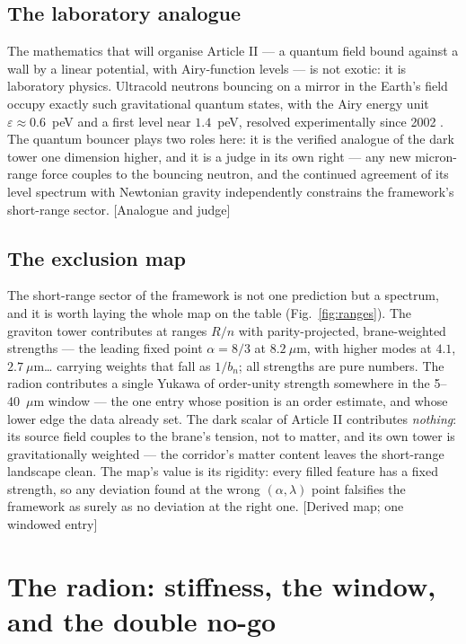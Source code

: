 \subsection{The laboratory analogue}
The mathematics that will organise Article II --- a quantum field bound against a wall by a linear potential, with Airy-function levels --- is not exotic: it is laboratory physics. Ultracold neutrons bouncing on a mirror in the Earth's field occupy exactly such gravitational quantum states, with the Airy energy unit $\varepsilon\approx0.6$~peV and a first level near $1.4$~peV, resolved experimentally since 2002 \cite{Nesv02}. The quantum bouncer plays two roles here: it is the verified analogue of the dark tower one dimension higher, and it is a judge in its own right --- any new micron-range force couples to the bouncing neutron, and the continued agreement of its level spectrum with Newtonian gravity independently constrains the framework's short-range sector. [Analogue and judge]

\subsection{The exclusion map}
The short-range sector of the framework is not one prediction but a spectrum, and it is worth laying the whole map on the table (Fig.~\ref{fig:ranges}). The graviton tower contributes at ranges $R/n$ with parity-projected, brane-weighted strengths --- the leading fixed point $\alpha=8/3$ at $8.2~\mu$m, with higher modes at $4.1$, $2.7~\mu$m\ldots{} carrying weights that fall as $1/b_{n}$; all strengths are pure numbers. The radion contributes a single Yukawa of order-unity strength somewhere in the 5--40~$\mu$m window --- the one entry whose position is an order estimate, and whose lower edge the data already set. The dark scalar of Article II contributes \emph{nothing}: its source field couples to the brane's tension, not to matter, and its own tower is gravitationally weighted --- the corridor's matter content leaves the short-range landscape clean. The map's value is its rigidity: every filled feature has a fixed strength, so any deviation found at the wrong $(\alpha,\lambda)$ point falsifies the framework as surely as no deviation at the right one. [Derived map; one windowed entry]

\section{The radion: stiffness, the window, and the double no-go}
